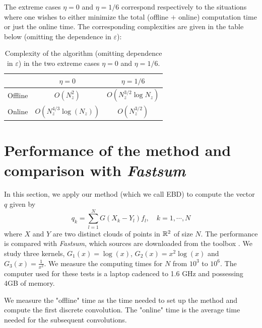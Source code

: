 \documentclass[smallextended]{svjour3}
\begin{document}
\begin{remark}
	The extreme cases $\eta= 0$ and $\eta = 1/6$ correspond respectively to the situations where one wishes to either minimize the total (offline $+$ online) computation time or just the online time. The corresponding complexities are given in the table below (omitting the dependence in $\varepsilon$):	
	\vspace{-0.5cm}
	\begin{table}[H]
		\centering
		\begin{tabular}{ |c|c|c| } 
			\hline
			& $\eta = 0 $    & $\eta = 1/6$       \\ 
			\hline
			Offline   & $O(N_z^2)$  & $O\left(N_z^{3/2} \log N_z\right)$  \\ 
			Online & $O(N_z^{4/3} \log(N_z))$ & $O(N_z^{3/2})$ \\ 
			\hline
			\end{tabular}
			\caption{Complexity of the algorithm (omitting dependence in $\varepsilon$) in the two extreme cases $\eta=0$ and $\eta = 1/6$.}
	\end{table}									
\end{remark}
	
\section{Performance of the method and comparison with \textit{Fastsum}}
\label{sec:numericalPerf}
In this section, we apply our method (which we call EBD) to compute the vector $q$ given by 
\[q_k = \sum_{l = 1}^{N} G(X_k - Y_l) f_l, \quad k = 1, \cdots, N\]
where $X$ and $Y$ are two distinct clouds of points in $\mathbb{R}^2$ of size $N$. The performance is compared with \textit{Fastsum}, which sources are downloaded from the toolbox \cite{Fastsum}. We study three kernels, $G_1(x) = \log(x)$, $G_2(x) = x^2 \log(x)$ and $G_3(x) = \frac{1}{x^2}$. We measure the computing times for $N$ from $10^3$ to $10^6$. The computer used for these tests is a laptop cadenced to 1.6 GHz and possessing 4GB of memory.

We measure the "offline" time as the time needed to set up the method and compute the first discrete convolution. The "online" time is the average time needed for the subsequent convolutions. 
\end{document}
